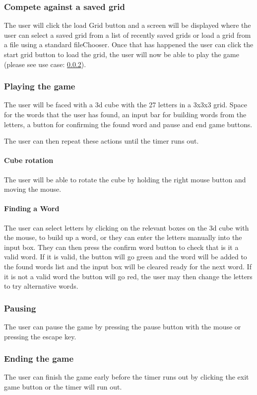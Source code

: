 \documentclass{project}
\begin{document}
		\subsubsection{Compete against a saved grid}
			The user will click the load Grid button and a screen will be displayed where the user can select a saved grid from a list of recently saved grids or load a grid from a file using a standard fileChooser. Once that has happened the user can click the start grid button to load the grid, the user will now be able to play the game (please see use case: \ref{Playing the game}).
		\subsubsection{Playing the game} \label{Playing the game}
			The user will be faced with a 3d cube with the 27 letters in a 3x3x3 grid. Space for the words that the user has found, an input bar for building words from the letters, a button for confirming the found word and pause and end game buttons. 
			
			The user can then repeat these actions until the timer runs out.
			
			\paragraph{Cube rotation}
			The user will be able to rotate the cube by holding the right mouse button and moving the mouse.
			\paragraph{Finding a Word}
			The user can select letters by clicking on the relevant boxes on the 3d cube with the mouse, to build up a word, or they can enter the letters manually into the input box. They can then press the confirm word button to check that is it a valid word. If it is valid, the button will go green and the word will be added to the found words list and the input box will be cleared ready for the next word. If it is not a valid word the button will go red, the user may then change the letters to try alternative words.
		
			
		\subsubsection{Pausing} \label{Pausing}
		The user can pause the game by pressing the pause button with the mouse or pressing the escape key.
		\subsubsection{Ending the game} \label{Ending the game}
		The user can finish the game early before the timer runs out by clicking the exit game button or the timer will run out.
\end{document}
